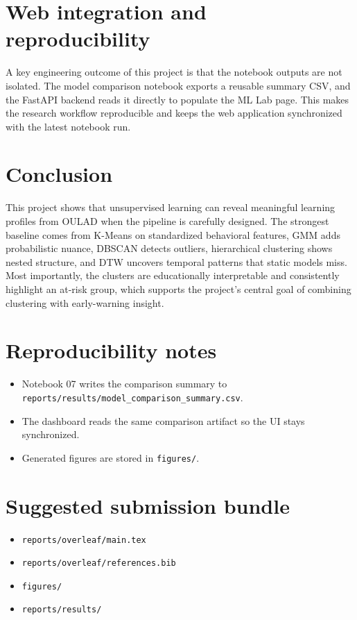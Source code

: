 \documentclass[11pt,a4paper]{article}
\begin{document}
\section{Web integration and reproducibility}
A key engineering outcome of this project is that the notebook outputs are not isolated. The model comparison notebook exports a reusable summary CSV, and the FastAPI backend reads it directly to populate the ML Lab page. This makes the research workflow reproducible and keeps the web application synchronized with the latest notebook run.

\section{Conclusion}
This project shows that unsupervised learning can reveal meaningful learning profiles from OULAD when the pipeline is carefully designed. The strongest baseline comes from K-Means on standardized behavioral features, GMM adds probabilistic nuance, DBSCAN detects outliers, hierarchical clustering shows nested structure, and DTW uncovers temporal patterns that static models miss. Most importantly, the clusters are educationally interpretable and consistently highlight an at-risk group, which supports the project’s central goal of combining clustering with early-warning insight.




\appendix
\section{Reproducibility notes}
\begin{itemize}[leftmargin=*]
  \item Notebook 07 writes the comparison summary to \texttt{reports/results/model\_comparison\_summary.csv}.
  \item The dashboard reads the same comparison artifact so the UI stays synchronized.
  \item Generated figures are stored in \texttt{figures/}.
\end{itemize}

\section{Suggested submission bundle}
\begin{itemize}[leftmargin=*]
  \item \texttt{reports/overleaf/main.tex}
  \item \texttt{reports/overleaf/references.bib}
  \item \texttt{figures/}
  \item \texttt{reports/results/}
\end{itemize}
\end{document}
